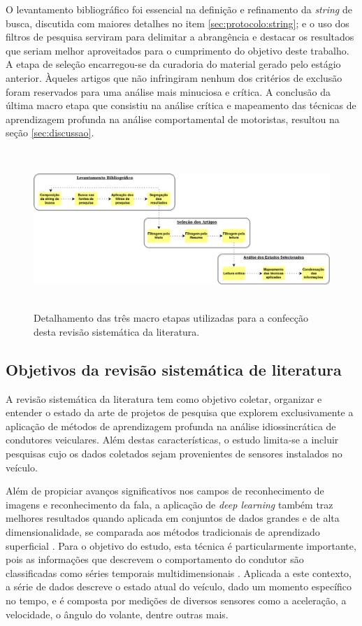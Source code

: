 \documentclass[10pt,journal,compsoc]{IEEEtran}
\begin{document}
O levantamento bibliográfico foi essencial na definição e refinamento da
\textit{string} de busca, discutida com maiores detalhes no item
\ref{sec:protocolo:string}; e o uso dos filtros de pesquisa serviram
para delimitar a abrangência e destacar os resultados que seriam
melhor aproveitados para o cumprimento do objetivo deste trabalho. A etapa
de seleção encarregou-se da curadoria do material gerado pelo estágio
anterior. Àqueles artigos que não infringiram nenhum dos critérios de
exclusão foram reservados para uma análise mais minuciosa e crítica. A
conclusão da última macro etapa que consistiu na análise crítica e mapeamento das
técnicas de aprendizagem profunda na análise comportamental de
motoristas, resultou na seção \ref{sec:discussao}.

\begin{figure}[!t]
\centering
\includegraphics[width=\textwidth, height=6cm]{etapas14}
\caption{Detalhamento das três macro etapas utilizadas para a
  confecção desta revisão sistemática da literatura.}
\label{fig:etapas}
\end{figure}

\subsection{Objetivos da revisão sistemática de literatura}
\label{sec:protocolo:objetivos}
A revisão sistemática da literatura tem como objetivo coletar,
organizar e entender o estado da arte de projetos de pesquisa que
explorem exclusivamente a aplicação de métodos de aprendizagem
profunda na análise idiossincrática de condutores veiculares. Além
destas características, o estudo limita-se a incluir pesquisas cujo os
dados coletados sejam provenientes de sensores instalados no veículo.

Além de propiciar avanços significativos nos campos de reconhecimento
de imagens e reconhecimento da fala, a aplicação
de \textit{deep learning} também traz melhores resultados quando
aplicada em conjuntos de dados grandes e de alta dimensionalidade,
se comparada aos métodos tradicionais de aprendizado superficial
\cite{Lecun2015436}. Para o objetivo do estudo, esta técnica é particularmente
importante, pois as informações que descrevem o comportamento do condutor são
classificadas como séries temporais multidimensionais
\cite{Liu2018}. Aplicada a este contexto, a série de dados descreve o estado atual do veículo, dado um momento
específico no tempo, e é composta por medições de diversos sensores
como a aceleração, a velocidade, o ângulo do volante, dentre outras mais.
\end{document}
